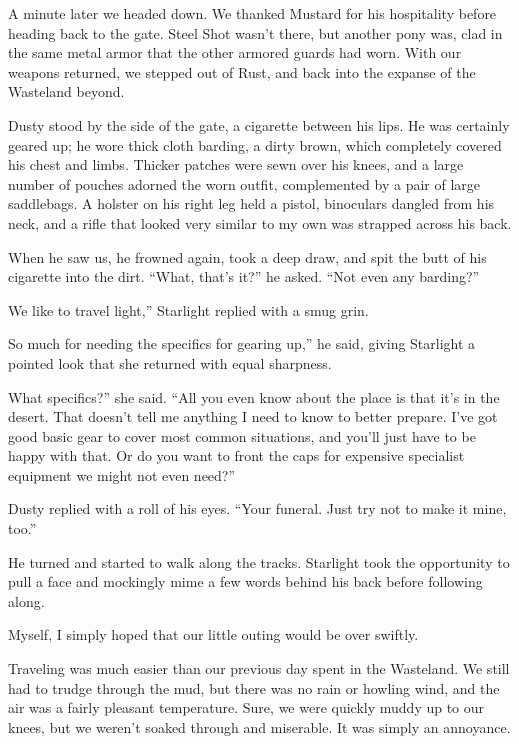 A minute later we headed down. We thanked Mustard for his hospitality before heading back to the gate. Steel Shot wasn’t there, but another pony was, clad in the same metal armor that the other armored guards had worn. With our weapons returned, we stepped out of Rust, and back into the expanse of the Wasteland beyond.

Dusty stood by the side of the gate, a cigarette between his lips. He was certainly geared up; he wore thick cloth barding, a dirty brown, which completely covered his chest and limbs. Thicker patches were sewn over his knees, and a large number of pouches adorned the worn outfit, complemented by a pair of large saddlebags. A holster on his right leg held a pistol, binoculars dangled from his neck, and a rifle that looked very similar to my own was strapped across his back.

When he saw us, he frowned again, took a deep draw, and spit the butt of his cigarette into the dirt. “What, that’s it?” he asked. “Not even any barding?”

\leavevmode{}We like to travel light,” Starlight replied with a smug grin.

\leavevmode{}So much for needing the specifics for gearing up,” he said, giving Starlight a pointed look that she returned with equal sharpness.

\leavevmode{}What specifics?” she said. “All you even know about the place is that it’s in the desert. That doesn’t tell me anything I need to know to better prepare. I’ve got good basic gear to cover most common situations, and you’ll just have to be happy with that. Or do you want to front the caps for expensive specialist equipment we might not even need?”

Dusty replied with a roll of his eyes. “Your funeral. Just try not to make it mine, too.”

He turned and started to walk along the tracks. Starlight took the opportunity to pull a face and mockingly mime a few words behind his back before following along.

Myself, I simply hoped that our little outing would be over swiftly.

{\br}%
Traveling was much easier than our previous day spent in the Wasteland. We still had to trudge through the mud, but there was no rain or howling wind, and the air was a fairly pleasant temperature. Sure, we were quickly muddy up to our knees, but we weren’t soaked through and miserable. It was simply an annoyance.

